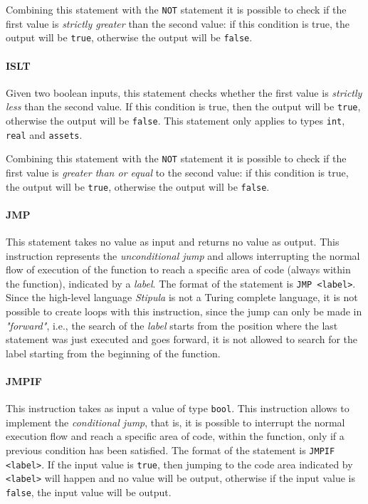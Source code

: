 Combining this statement with the \verb|NOT| statement it is possible to check if the first value is 
\textit{strictly greater} than the second value: if this condition is true, the output will be 
\verb|true|, otherwise the output will be \verb|false|.

\paragraph{ISLT}

Given two boolean inputs, this statement checks whether the first value is \textit{strictly less} than the 
second value. If this condition is true, then the output will be \verb|true|, otherwise the output will be 
\verb|false|. This statement only applies to types \verb|int|, \verb|real| and \verb|assets|.

Combining this statement with the \verb|NOT| statement it is possible to check if the first value is 
\textit{greater than or equal} to the second value: if this condition is true, the output will be 
\verb|true|, otherwise the output will be \verb|false|.

\paragraph{JMP}

This statement takes no value as input and returns no value as output. This instruction represents the 
\textit{unconditional jump} and allows interrupting the normal flow of execution of the function to reach 
a specific area of code (always within the function), indicated by a \textit{label}. The format of the 
statement is \verb|JMP <label>|. Since the high-level language \textit{Stipula} is not a Turing complete 
language, it is not possible to create loops with this instruction, since the jump can only be made in 
\textit{"forward"}, i.e., the search of the \textit{label} starts from the position where the last 
statement was just executed and goes forward, it is not allowed to search for the label starting from the 
beginning of the function. 

\paragraph{JMPIF}

This instruction takes as input a value of type \verb|bool|. This instruction allows to implement the 
\textit{conditional jump}, that is, it is possible to interrupt the normal execution flow and reach a 
specific area of code, within the function, only if a previous condition has been satisfied. The format 
of the statement is \verb|JMPIF <label>|. If the input value is \verb|true|, then jumping to the code area 
indicated by \verb|<label>| will happen and no value will be output, otherwise if the input value is 
\verb|false|, the input value will be output.

